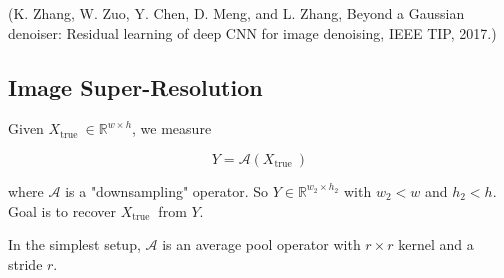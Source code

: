 \documentclass{report}
\begin{document}
\begin{definition}[8.4][DnCNN]
    (K. Zhang, W. Zuo, Y. Chen, D. Meng, and L. Zhang, Beyond a Gaussian denoiser: Residual learning of deep CNN for image denoising, IEEE TIP, 2017.)
\end{definition}

\subsection{Image Super-Resolution}

\begin{definition}
    Given $X_{\text {true }} \in \mathbb{R}^{w \times h}$, we measure

    $$
    Y=\mathcal{A}\left(X_{\text {true }}\right)
    $$

    where $\mathcal{A}$ is a "downsampling" operator. So $Y \in \mathbb{R}^{w_{2} \times h_{2}}$ with $w_{2}<w$ and $h_{2}<h$. Goal is to recover $X_{\text {true }}$ from $Y$.

    In the simplest setup, $\mathcal{A}$ is an average pool operator with $r \times r$ kernel and a stride $r$.
\end{definition}
\end{document}
